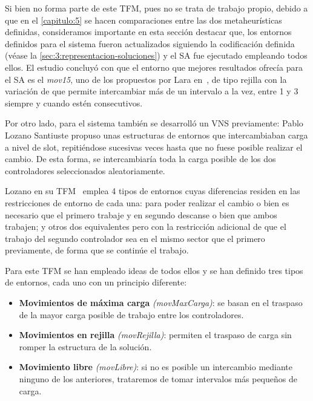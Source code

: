 Si bien no forma parte de este TFM, pues no se trata de trabajo propio, debido a que en el \autoref{capitulo:5} se hacen comparaciones entre las dos metaheurísticas definidas, consideramos importante en esta sección destacar que, los entornos definidos para el sistema \legacy{} fueron actualizados siguiendo la codificación definida (véase la \autoref{sec:3:representacion-soluciones})
y el SA fue ejecutado empleando todos ellos. El estudio concluyó con que el entorno que mejores resultados ofrecía para el SA es el \textit{mov15}, uno de los propuestos por Lara en~\cite{tesis-jonatan}, de tipo rejilla con la variación de que permite intercambiar más de un intervalo a la vez, entre 1 y 3 siempre y cuando estén consecutivos.

Por otro lado, para el sistema \legacy{} también se desarrolló un VNS previamente: Pablo Lozano Santiuste propuso unas estructuras de entornos que intercambiaban carga a nivel de slot, repitiéndose sucesivas veces hasta que no fuese posible realizar el cambio. De esta forma, se intercambiaría toda la carga posible de los dos controladores seleccionados aleatoriamente. 

Lozano en su TFM~\cite{tesis-pablo} emplea 4 tipos de entornos cuyas diferencias residen en las restricciones de entorno de cada una: para poder realizar el cambio o bien es necesario que el primero trabaje y en segundo descanse o bien que ambos trabajen; y otros dos equivalentes pero con la restricción adicional de que el trabajo del segundo controlador sea en el mismo sector que el primero previamente, de forma que se continúe el trabajo.

Para este TFM se han empleado ideas de todos ellos y se han definido tres tipos de entornos, cada uno con un principio diferente:

\begin{itemize}
    \item \textbf{Movimientos de máxima carga} \textit{(movMaxCarga)}: se basan en el traspaso de la mayor carga posible de trabajo entre los controladores.

    \item \textbf{Movimientos en rejilla} \textit{(movRejilla)}: permiten el traspaso de carga sin romper la estructura de la solución.

    \item \textbf{Movimiento libre} \textit{(movLibre)}: si no es posible un intercambio mediante ninguno de los anteriores, trataremos de tomar intervalos más pequeños de carga.
\end{itemize}

